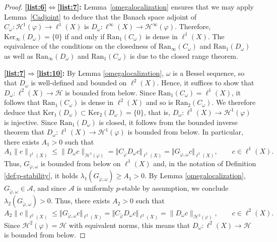 \documentclass{amsart}
\def\Hil{\mathcal{H}}
\newcommand{\A}[0]{{\mathcal{A}}}
\begin{document}
\begin{proof}
\textbf{\ref{list:6}$\Leftrightarrow$\ref{list:7}:}  Lemma~\ref{omegalocalization} ensures that we may apply Lemma~\ref{Cadjoint} to deduce that the Banach space adjoint of $C_{\omega}:\Hil^1(\varphi)\to \ell^1(X)$ is $D_{\omega}:\ell^\infty(X)\to\Hil^\infty(\varphi)$. Therefore, $\text{Ker}_\infty(D_\omega)=\{0\}$ if and only if $\text{Ran}_1(C_\omega)$ is dense in $\ell^1(X)$.   The equivalence of the conditions on the closedness of $\text{Ran}_\infty(C_\omega)$ and $\text{Ran}_1(D_\omega)$ as well as $\text{Ran}_\infty(D_\omega)$ and $\text{Ran}_1(C_\omega)$ is due to the closed range theorem.

\medskip

\textbf{\ref{list:7}$\Rightarrow$\ref{list:10}:} By Lemma \ref{omegalocalization}, $\omega$ is a Bessel sequence, so that $D_\omega$ is well-defined and bounded on $\ell^2(X)$. Hence, it suffices to show that $D_\omega : \ell^2(X) \to \Hil$ is bounded from below. Since $\text{Ran}_1(C_\omega)=\ell^1(X)$, it follows that $\text{Ran}_1(C_\omega)$ is dense in $\ell^2(X)$ and so is $\text{Ran}_2(C_\omega)$. We therefore deduce that $\text{Ker}_1(D_\omega)\subset \text{Ker}_2(D_\omega)=\{0\}$, that is, $D_\omega:\ell^1(X)\to \Hil^1(\varphi)$ is injective. Since $\text{Ran}_1(D_\omega)$ is closed, it follows from the bounded inverse theorem that $D_\omega:\ell^1(X) \to \Hil^1(\varphi)$ is bounded from below. In particular, there exists \(A_1>0\) such that
$$A_1\|c\|_{\ell^1(X)} \leq \|D_\omega c\|_{\mathcal H^1(\varphi)} = \Vert C_{\widetilde{\varphi}} D_\omega c\Vert_{\ell^1(X)} = \Vert G_{\widetilde{\varphi}, \omega} c\Vert_{\ell^1(X)}, \qquad c\in\ell^1(X).$$
Thus, $G_{\widetilde{\varphi}, \omega}$ is bounded from below on $\ell^1(X)$ and, in the notation of Definition \ref{def:p-stability}, it holds \(\lambda_1(G_{\widetilde{\varphi}, \omega}) \geq A_1 > 0\). By Lemma \ref{omegalocalization}, $G_{\widetilde{\varphi}, \omega} \in \A$, and since $\A$ is uniformly $p$-stable by assumption, we conclude $\lambda_2(G_{\widetilde{\varphi}, \omega}) > 0$. Thus, there exists $A_2 > 0$ such that
$$A_2\|c\|_{\ell^2(X)} \leq \Vert G_{\widetilde{\varphi}, \omega} c\Vert_{\ell^2(X)} = \Vert C_{\widetilde{\varphi}} D_\omega c\Vert_{\ell^2(X)} = \|D_\omega c\|_{\mathcal H^2(\varphi)}, \qquad c\in\ell^2(X).$$ Since $\mathcal H^2(\varphi) = \Hil$ with equivalent norms, this means that $D_\omega : \ell^2(X) \to \Hil$ is bounded from below. \medskip


\end{proof}
\end{document}

